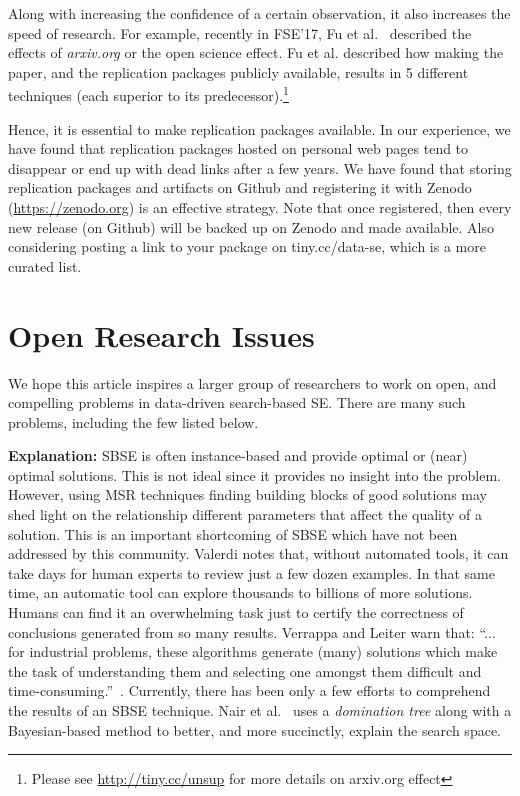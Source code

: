\documentclass[sigconf]{acmart}
\begin{document}
Along with increasing the confidence of a certain observation, it also increases the speed of research. For example, recently in FSE'17, Fu et al.~\cite{fu2017revisiting} described the effects of \textit{arxiv.org} or the open science effect. Fu et al. described how making the paper, and the replication packages publicly available, results in 5 different techniques (each superior to its predecessor).\footnote{Please see \url{http://tiny.cc/unsup}  for more details on arxiv.org effect} 

Hence, it is essential to make replication packages available. 
In our experience, we have found that replication packages hosted on personal web pages tend to disappear or end up with dead links after a few years.
We have found that storing replication packages and artifacts on Github and registering it with Zenodo (\href{https://zenodo.org}{https://zenodo.org}) is an effective strategy. 
Note that once registered, then every new release (on Github) will be backed up on Zenodo and made available. Also considering posting a link to your package on tiny.cc/data-se, which is a more curated list. 

\section{Open Research Issues} \label{sec:open}
We hope this article inspires a larger group of researchers to work
on open, and compelling problems
in data-driven search-based SE. There are many such problems, including the few listed below.


  \noindent\textbf{Explanation: } SBSE is often instance-based and provide optimal or (near) optimal solutions. This is not ideal since it provides no insight into the problem. However, using MSR techniques finding
building blocks of good solutions may shed light on the relationship
different parameters that affect the quality of a solution. This is an important shortcoming of SBSE which have not been addressed by this community. Valerdi
notes that, without automated tools, it can take days for human
experts to review just a few dozen examples. In that same
time, an automatic tool can explore thousands to billions of more
solutions. Humans can find it an overwhelming task just to
certify the correctness of conclusions generated from so many
results. Verrappa and Leiter warn that:
``... for industrial problems, these algorithms generate
(many) solutions which make the task of understanding
them and selecting one amongst them difficult
and time-consuming.''~\cite{veerappa2011understanding}. Currently, there has been only a few efforts to comprehend the results of an SBSE technique. Nair et al.~\cite{nair2017flash}
uses a \textit{domination tree} along with a Bayesian-based method to better, and more succinctly,
explain the search space. 
\end{document}
